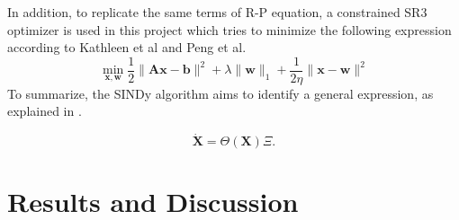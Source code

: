 \documentclass[review]{elsarticle}
\begin{document}
In addition, to replicate the same terms of R-P equation, a constrained SR3 optimizer is used in this project which tries to minimize the following expression according to Kathleen et al\cite{champion2020unified} and Peng et al.\cite{zheng2018sparse}   
\begin{equation}
	\min _{\boldsymbol{x}, \boldsymbol{w}} \frac{1}{2}\|\mathbf{A} \boldsymbol{x}-\boldsymbol{b}\|^2+\lambda\|\boldsymbol{w}\|_1+\frac{1}{2 \eta}\|\boldsymbol{x}-\boldsymbol{w}\|^2
\end{equation}
To summarize, the SINDy algorithm aims to identify a general expression, as explained in \cite{brunton2017discovering}.
\begin{linenomath}
\begin{equation}
	\dot{\mathbf{X}}=\Theta(\mathbf{X}) \Xi.
\end{equation}
\end{linenomath}

\section{Results and Discussion}
\end{document}
